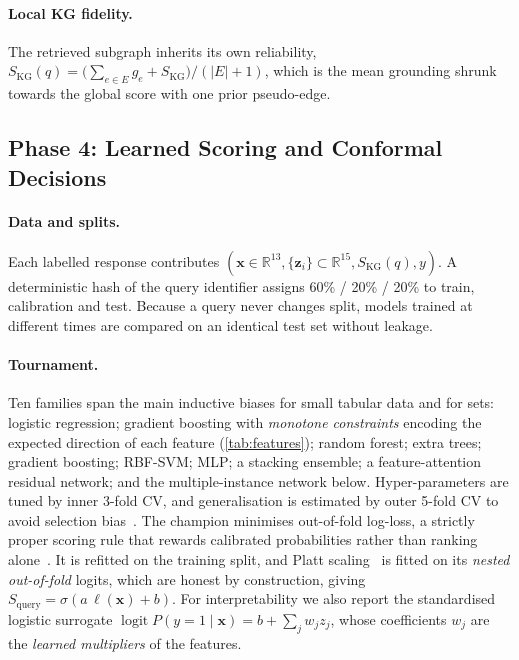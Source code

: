 \documentclass[10pt,twocolumn]{article}
\theoremstyle{remark}
\DeclareMathOperator{\logit}{logit}
\newcommand{\R}{\mathbb{R}}
\newcommand{\SKGq}{S_{\mathrm{KG}}(q)}
\begin{document}
\paragraph{Local KG fidelity.}
The retrieved subgraph inherits its own reliability,
$\SKGq=\big(\sum_{e\in E}g_e+S_{\mathrm{KG}}\big)/(|E|+1)$, which is the mean grounding shrunk towards the global
score with one prior pseudo-edge.

\subsection{Phase 4: Learned Scoring and Conformal Decisions}
\label{sec:phase4}

\paragraph{Data and splits.}
Each labelled response contributes $(\bm x\in\R^{13},\{\bm z_i\}\subset\R^{15},\SKGq,y)$. A deterministic hash of the query identifier assigns 60\% /
20\% / 20\% to train, calibration and test. Because a query never changes split, models trained at different times
are compared on an identical test set without leakage.

\paragraph{Tournament.}
Ten families span the main inductive biases for small tabular data and for sets: logistic regression; gradient
boosting with \emph{monotone constraints} encoding the expected direction of each feature (\cref{tab:features});
random forest; extra trees; gradient boosting; RBF-SVM; MLP; a stacking ensemble; a feature-attention residual network;
and the multiple-instance network below. Hyper-parameters are tuned by inner 3-fold CV, and generalisation is
estimated by outer 5-fold CV to avoid selection bias~\cite{cawley2010overfitting}. The champion minimises
out-of-fold log-loss, a strictly proper scoring rule that rewards calibrated probabilities rather than ranking
alone~\cite{gneiting2007scoring}. It is refitted on the training split, and Platt scaling~\cite{platt1999probabilistic}
is fitted on its \emph{nested out-of-fold} logits, which are honest by construction, giving
$S_{\mathrm{query}}=\sigma(a\,\ell(\bm x)+b)$. For interpretability we also report the standardised logistic surrogate
$\logit P(y=1\mid\bm x)=b+\sum_j w_j z_j$, whose coefficients $w_j$ are the \emph{learned multipliers} of the features.
\end{document}
